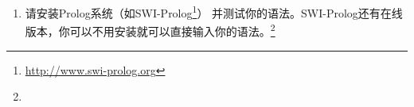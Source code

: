 {\begin{enumerate}
\eal
\ex 
\gll Der Mann hilft der Frau jetzt.\\
     .\nom{} 男人 帮助 .\dat{} 女人 现在\\
\ex 
\gll Der Mann hilft der Frau neben dem Bushäuschen.\\
     .\nom{} 男人 帮助 .\dat{} 女人 在……旁  公交车候车亭\\
\ex 
\gll Er gibt ihr das Buch jetzt.\\
     他.\nom{} 给 她.\dat{} .\acc{} 书 现在\\
\ex 
\gll Er gibt ihr das Buch neben dem Bushäuschen.\\
     他.\nom{} 给 她.\dat{} .\acc{} 书 在……旁  公交车候车亭\\
\ex 
\gll Er wartet jetzt auf ein Wunder.\\
     他.\nom{} 等 现在 \textsc{prep} 一 奇迹\\
\ex 
\gll Er wartet neben dem Bushäuschen auf ein Wunder.\\
      他.\nom{} 等 在……旁 .\dat{} 公交车候车亭 \textsc{prep} 一 奇迹\\
\zl
\item 请安装Prolog系统（如SWI-Prolog\footnote{%
\url{http://www.swi-prolog.org} 
}）
并测试你的语法。SWI-Prolog还有在线版本，你可以不用安装就可以直接输入你的语法。\footnote{%
}
\end{enumerate}}
